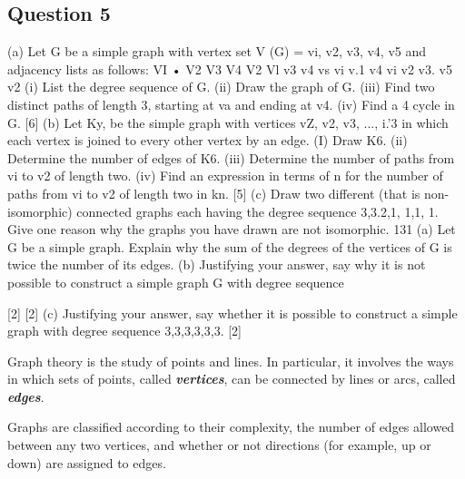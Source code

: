 \subsection{Question 5} (a) Let G be a simple graph with vertex set V (G) = {vi, v2, v3, v4, v5} and adjacency lists as follows: 
VI • V2 V3 V4 V2 Vl v3 v4 vs 
vi v.1 v4 vi v2 v3. v5 v2 
(i) List the degree sequence of G. (ii) Draw the graph of G. (iii) Find two distinct paths of length 3, starting at va and ending at v4. (iv) Find a 4 cycle in G. 
[6] 
(b) Let Ky, be the simple graph with vertices vZ, v2, v3, ..., i.'3 in which each vertex is joined to every other vertex by an edge. 
(I) Draw K6. (ii) Determine the number of edges of K6. (iii) Determine the number of paths from vi to v2 of length two. (iv) Find an expression in terms of n for the number of paths from vi to v2 of length two in kn. [5] 
(c) Draw two different (that is non-isomorphic) connected graphs each having the degree sequence 3,3.2,1, 1,1, 1. Give one reason why the graphs you have drawn are not isomorphic. 131 
(a) Let G be a simple graph. Explain why the sum of the degrees of the vertices of G is twice the number of its edges. (b) Justifying your answer, say why it is not possible to construct a simple graph G with degree sequence 

[2] 
[2] 
(c) Justifying your answer, say whether it is possible to construct a simple graph with degree sequence 3,3,3,3,3,3. [2] 

\newpage






Graph theory is the study of points and lines. In particular, it involves the ways in which sets of points, called \textit{\textbf{vertices}}, can be connected by lines or arcs, called \textit{\textbf{edges}}.

Graphs are classified according to their complexity, the number of edges allowed between any two vertices, and whether or not directions (for example, up or down) are assigned to edges. 


